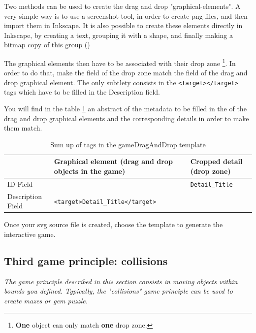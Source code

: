 Two methods can be used to create the drag and drop "graphical-elements".
A very simple way is to use a screenshot tool, in order to create png files, and then import them in Inkscape.
It is also possible to create these elements directly in Inkscape, by creating a text, grouping it with a shape,
and finally making a bitmap copy of this group ()


The graphical elements then have to be associated with their drop zone \footnote{\textbf{One} object
can only match \textbf{one} drop zone.}. In order to do that, make the  field of the drop zone match
the  field of the drag and drop graphical element. 
The only subtlety consists in the  \verb|<target></target>| tags which have to be filled in the \softmenu
{Description} field.

You will find in the table \ref{tag2_sumup} an abstract of the metadata to be filled in the  
of the drag and drop graphical elements and the corresponding details in order to make them match.

\begin{table}
\begin{tabular}{|p{}|p{2.5in}|p{1.5in}|}
\hline
 & Graphical element (drag and drop objects in the game) & Cropped detail (drop zone)\\
\hline
ID Field & & \verb|Detail_Title|\\
\hline
Description Field & \verb|<target>Detail_Title</target>| & \\
\hline
\end{tabular}
\caption{Sum up of tags in the gameDragAndDrop template}
\label{tag2_sumup}
\end{table}

Once your svg source file is created, choose the template  to generate the interactive game.

\subsection{Third game principle: collisions}

\textit{The game principle described in this section consists in moving objects
within bounds you defined. Typically, the "collisions" game principle
can be used to create mazes or gem puzzle.}


